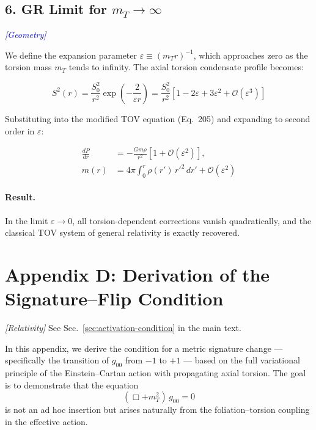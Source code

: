 \documentclass{article}
\newcommand{\geometrytag}{\textcolor{blue}{\textit{[Geometry]}}}
\newcommand{\grtag}{\textcolor{blue!40!black}{\textit{[Relativity]}}}
\begin{document}
\subsection*{6. GR Limit for $m_T \to \infty$}
\geometrytag

We define the expansion parameter \(\varepsilon \equiv (m_T r)^{-1}\), which approaches zero as the torsion mass \(m_T\) tends to infinity. The axial torsion condensate profile becomes:

\begin{equation}
S^2(r) = \frac{S_0^2}{r^2} \exp\left(-\frac{2}{\varepsilon r}\right) = \frac{S_0^2}{r^2} \left[1 - 2\varepsilon + 3\varepsilon^2 + \mathcal{O}(\varepsilon^3)\right]
\tag{216}
\end{equation}

Substituting into the modified TOV equation (Eq.~205) and expanding to second order in \(\varepsilon\):

\begin{align}
\frac{dP}{dr} &= -\frac{G m \rho}{r^2} \left[1 + \mathcal{O}(\varepsilon^2)\right],
\tag{217} \\
m(r) &= 4\pi \int_0^r \rho(r')\, r'^2\, dr' + \mathcal{O}(\varepsilon^2)
\tag{218}
\end{align}

\paragraph{Result.} In the limit \(\varepsilon \to 0\), all torsion-dependent corrections vanish quadratically, and the classical TOV system of general relativity is exactly recovered.





\section*{Appendix D: Derivation of the Signature–Flip Condition}
\grtag
\label{app:signature-derivation}
See Sec.~\ref{sec:activation-condition} in the main text.



In this appendix, we derive the condition for a metric signature change — specifically the transition of $g_{00}$ from $-1$ to $+1$ — based on the full variational principle of the Einstein–Cartan action with propagating axial torsion. The goal is to demonstrate that the equation
\begin{equation}\label{eq:auto188}
(\Box + m_T^2)\, g_{00} = 0
\end{equation}
is not an ad hoc insertion but arises naturally from the foliation–torsion coupling in the effective action.
\end{document}

